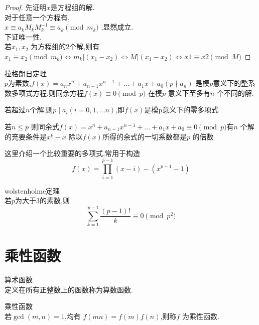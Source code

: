 \begin{proof}
  先证明$x$是方程组的解.\\
对于任意一个方程有,\\
$x \equiv a_kM_kM_k^{-1}  \equiv a_k \pmod{m_k}$ ,显然成立.\\
下证唯一性.\\
若$x_1,x_2$ 为方程组的2个解,则有$x_1 \equiv x_2 \pmod{m_k} \iff m_k|(x_1-x_2) \iff M|(x_1-x_2) \iff x1 \equiv x2 \pmod{M}$
\end{proof}


\begin{theorem}
  拉格朗日定理\\
  $p$为素数,$f(x)=a_nx^n+a_{n-1}x^{n-1}+\dots +a_1x+a_0(p \nmid a_n)$ 
  是模$p$意义下的整系数多项式方程,则同余方程$f(x) \equiv 0 \pmod{p}$ 在模$p$ 意义下至多有$n$ 个不同的解.
\end{theorem}


\begin{corollary}
  若超过$n$个解,则$p \mid a_i(i=0,1,\dots n)$,即$f(x) \text{是模p意义下的零多项式}$
\end{corollary}

\begin{corollary}
  若$n \leq p$ 则同余式$f(x)=x^n+a_{n-1}x^{n-1}+\dots +a_1x+a_0 \equiv 0 \pmod{p}$有$n$ 
  个解的充要条件是$x^p-x$ 除以$f(x)$所得的余式的一切系数都是$p$ 的倍数
\end{corollary}
这里介绍一个比较重要的多项式,常用于构造\\
$$
f(x)=\prod_{i=1}^{p-1}(x-i) -(x^{p-1}-1)
$$ 

\begin{theorem}
  wolstenholme定理\\
  若$p$为大于3的素数,则
  $$
  \sum_{k=1}^{p-1} \frac{(p-1)!}{k} \equiv 0 \pmod{p^2} 
  $$
\end{theorem}



\section{乘性函数}

\begin{definition}
  算术函数\\
  定义在所有正整数上的函数称为算数函数.
\end{definition}

\begin{definition}
  乘性函数\\
  若$\gcd(m,n)=1$,均有 $f(mn)=f(m)f(n)$,则称$f$ 为乘性函数.
\end{definition}

